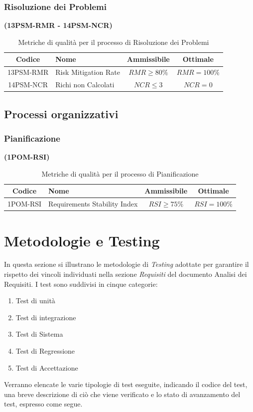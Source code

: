 \documentclass{article}
\begin{document}
\subsubsection{Risoluzione dei Problemi}%
\textbf{(13PSM-RMR - 14PSM-NCR)}
\begin{table}[H]
    \centering
    \renewcommand{\arraystretch}{1.5} %
    \begin{tabular}{|c|l|c|c|}
        \hline
        \textbf{Codice} & \textbf{Nome} & \textbf{Ammissibile} & \textbf{Ottimale} \\
        \hline
        13PSM-RMR & Risk Mitigation Rate & $RMR \geq 80\%$ & $RMR = 100\%$ \\
        14PSM-NCR & Richi non Calcolati & $NCR \leq 3$ & $NCR = 0$ \\
        \hline
    \end{tabular}
    \label{tab:risoluzione_problemi}
    \caption{Metriche di qualità per il processo di Risoluzione dei Problemi}
\end{table}
\subsection{Processi organizzativi}
\subsubsection{Pianificazione} %
\textbf{(1POM-RSI)}
\begin{table}[H]
    \centering
    \renewcommand{\arraystretch}{1.5} %
    \begin{tabular}{|c|l|c|c|}
        \hline
        \textbf{Codice} & \textbf{Nome} & \textbf{Ammissibile} & \textbf{Ottimale} \\
        \hline
        1POM-RSI & Requirements Stability Index & $RSI \geq 75\%$ & $RSI = 100\%$ \\
        \hline
    \end{tabular}
    \label{tab:pianificazione}
    \caption{Metriche di qualità per il processo di Pianificazione}
\end{table}

\section{Metodologie e Testing}
In questa sezione si illustrano le metodologie di \textit{Testing} adottate per garantire il rispetto dei vincoli individuati
nella sezione \textit{Requisiti} del documento Analisi dei Requisiti. I test sono suddivisi in cinque categorie:
\begin{enumerate}
    \item Test di unità
    \item Test di integrazione
    \item Test di Sistema
    \item Test di Regressione
    \item Test di Accettazione
\end{enumerate}
Verranno elencate le varie tipologie di test eseguite, indicando il codice del test, una breve descrizione di ciò che viene verificato e lo stato di avanzamento del test, espresso come segue.
\end{document}
